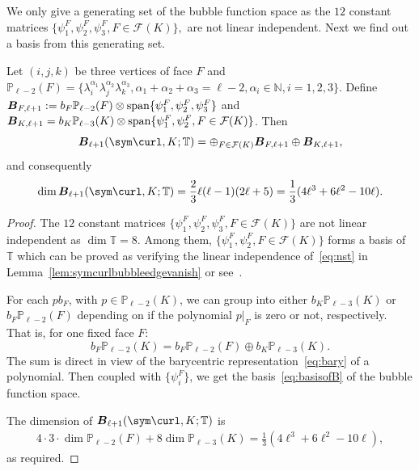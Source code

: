 We only give a generating set of the bubble function space as the $12$ constant matrices $\{ \psi_1^F, \psi_2^F, \psi_3^F, F\in \mathcal F(K)\}, $ are not linear independent. Next we find out a basis from this generating set. 
\begin{lemma}
Let $(i,j,k)$ be three vertices of face $F$ and $\mathbb P_{\ell-2}(F) = \{ \lambda_{i}^{\alpha_1}\lambda_{j}^{\alpha_2}\lambda_{k}^{\alpha_3}, \alpha_1+\alpha_2+\alpha_3 = \ell-2, \alpha_i\in \mathbb N, i=1,2,3\}$.
 Define $\boldsymbol B_{F,\ell + 1}: = b_F\mathbb P_{\ell-2}(F)\otimes {\rm span}\{ \psi_1^F, \psi_2^F, \psi_3^F\}$ and $\boldsymbol B_{K, \ell + 1} = b_K\mathbb P_{\ell-3}(K)\otimes {\rm span}\{ \psi_1^F, \psi_2^F, F\in \mathcal F(K)\}$. Then
\begin{equation}\label{eq:basisofB}
\boldsymbol B_{\ell+1}(\sym\curl, K;\mathbb T)  = \oplus_{F\in \mathcal F(K)} \boldsymbol B_{F,\ell + 1} \oplus \boldsymbol B_{K,\ell + 1},
\end{equation} 
and consequently
$$\dim \boldsymbol B_{\ell+1}(\sym\curl, K;\mathbb T)=\frac{2}{3}\ell(\ell-1)(2\ell+5)=\frac{1}{3}(4\ell^3+6\ell^2-10\ell).$$ 
\end{lemma}
\begin{proof}
The $12$ constant matrices $\{ \psi_1^F, \psi_2^F, \psi_3^F, F\in \mathcal F(K)\}$ are not linear independent as $\dim \mathbb T = 8$. Among them, $\{ \psi_1^F, \psi_2^F, F\in \mathcal F(K)\}$ forms a basis of $\mathbb T$ which can be proved as verifying the linear independence of~\eqref{eq:nst} in Lemma~\ref{lem:symcurlbubbleedgevanish} or see~\cite{HuLiang2020}. 

For each $p b_F$, with $p\in \mathbb P_{\ell - 2}(K)$, we can group into either $b_K\mathbb P_{\ell-3}(K)$ or $b_F\mathbb P_{\ell-2}(F)$  depending on if the polynomial $p|_F$ is zero or not, respectively. That is, for one fixed face $F$:
$$
b_F \mathbb P_{\ell - 2}(K) = b_F\mathbb P_{\ell-2}(F) \oplus b_K\mathbb P_{\ell-3}(K). 
$$
The sum is direct in view of the barycentric representation~\eqref{eq:bary} of a polynomial.
Then coupled with $\{\psi_i^F\}$, we get the basis~\eqref{eq:basisofB} of the bubble function space.

The dimension of $\boldsymbol B_{\ell+1}(\sym\curl, K;\mathbb T) $ is 
\begin{align*}
4\cdot 3 \cdot \dim\mathbb P_{\ell-2}(F) + 8 \dim\mathbb P_{\ell-3}(K) = \frac{1}{3}(4\ell^3+6\ell^2-10\ell),
\end{align*}
as required.
\end{proof}


